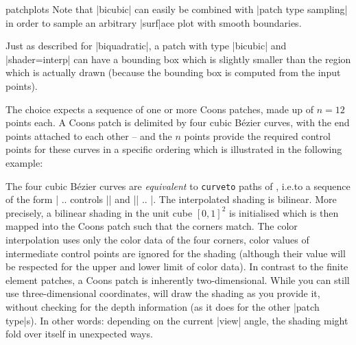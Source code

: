 {\begin{pgfplotslibrary}{patchplots}
Note that |bicubic| can easily be combined with |patch type sampling| in order
to sample an arbitrary |surf|ace plot with smooth boundaries.

Just as described for |biquadratic|, a patch with type |bicubic| and
|shader=interp| can have a bounding box which is slightly smaller than the
region which is actually drawn (because the bounding box is computed from the
input points).

The choice  expects a sequence of one or more Coons
patches, made up of $n=12$ points each. A Coons patch is delimited by four
cubic Bézier curves, with the end points attached to each other -- and the $n$
points provide the required control points for these curves in a specific
ordering which is illustrated in the following example:
%
\begin{codeexample}[]
\end{codeexample}
%
\noindent The four cubic Bézier curves are \emph{equivalent} to
\texttt{curveto} paths of \pgfname{}, i.e.\@ to a sequence of the form
| .. controls || and || .. |.
The interpolated shading is bilinear. More precisely, a bilinear shading in the
unit cube $[0,1]^2$ is initialised which is then mapped into the Coons patch
such that the corners match. The color interpolation uses only the color data
of the four corners, color values of intermediate control points are ignored
for the shading (although their value will be respected for the upper and lower
limit of color data). In contrast to the finite element patches, a Coons patch
is inherently two-dimensional. While you can still use three-dimensional
coordinates, \PGFPlots{} will draw the shading as you provide it, without
checking for the depth information (as it does for the other |patch type|s). In
other words: depending on the current |view| angle, the shading might fold over
itself in unexpected ways.


\end{pgfplotslibrary}}
